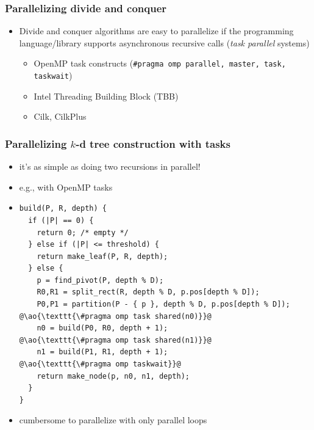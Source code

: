 \documentclass[12pt,dvipdfmx]{beamer}
\newcommand{\ao}[1]{{\color{blue}#1}}
\newcommand{\aka}[1]{{\color{red}#1}}
\begin{document}
\begin{frame}
\frametitle{Parallelizing divide and conquer}
\begin{itemize}
\item Divide and conquer algorithms are easy to
  parallelize if the programming language/library
  supports asynchronous recursive calls 
  (\aka{\em task parallel\/} systems)
  \begin{itemize}
  \item OpenMP task constructs ({\tt \#pragma omp parallel, master, task, taskwait})
  \item Intel Threading Building Block (TBB)
  \item Cilk, CilkPlus
  \end{itemize}

\end{itemize}

\begin{center}
\end{center}
\end{frame}

\begin{frame}[fragile]
\frametitle{Parallelizing $k$-d tree construction with tasks}
\begin{itemize}
\item it's as simple as doing two recursions in parallel!
\item e.g., with OpenMP tasks
\item []
\begin{lstlisting}
build(P, R, depth) {
  if (|P| == 0) {
    return 0; /* empty */
  } else if (|P| <= threshold) {
    return make_leaf(P, R, depth);
  } else {
    p = find_pivot(P, depth % D);
    R0,R1 = split_rect(R, depth % D, p.pos[depth % D]);
    P0,P1 = partition(P - { p }, depth % D, p.pos[depth % D]);
@\ao{\texttt{\#pragma omp task shared(n0)}}@
    n0 = build(P0, R0, depth + 1);
@\ao{\texttt{\#pragma omp task shared(n1)}}@
    n1 = build(P1, R1, depth + 1);
@\ao{\texttt{\#pragma omp taskwait}}@
    return make_node(p, n0, n1, depth);
  }
}
\end{lstlisting}
\item cumbersome to parallelize with only parallel loops
\end{itemize}
\end{frame}
\end{document}
